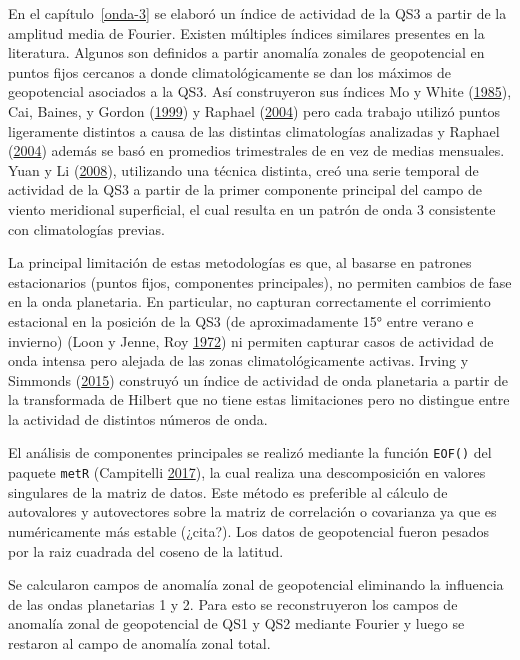 \documentclass[spanish,a4paper,12p]{book}
\begin{document}
En el capítulo~\ref{onda-3} se elaboró un índice de actividad de la QS3
a partir de la amplitud media de Fourier. Existen múltiples índices
similares presentes en la literatura. Algunos son definidos a partir
anomalía zonales de geopotencial en puntos fijos cercanos a donde
climatológicamente se dan los máximos de geopotencial asociados a la
QS3. Así construyeron sus índices Mo y White
(\protect\hyperlink{ref-Mo1985}{1985}), Cai, Baines, y Gordon
(\protect\hyperlink{ref-Cai1999}{1999}) y Raphael
(\protect\hyperlink{ref-Raphael2004a}{2004}) pero cada trabajo utilizó
puntos ligeramente distintos a causa de las distintas climatologías
analizadas y Raphael (\protect\hyperlink{ref-Raphael2004a}{2004}) además
se basó en promedios trimestrales de en vez de medias mensuales. Yuan y
Li (\protect\hyperlink{ref-Yuan2008}{2008}), utilizando una técnica
distinta, creó una serie temporal de actividad de la QS3 a partir de la
primer componente principal del campo de viento meridional superficial,
el cual resulta en un patrón de onda 3 consistente con climatologías
previas.

La principal limitación de estas metodologías es que, al basarse en
patrones estacionarios (puntos fijos, componentes principales), no
permiten cambios de fase en la onda planetaria. En particular, no
capturan correctamente el corrimiento estacional en la posición de la
QS3 (de aproximadamente 15° entre verano e invierno) (Loon y Jenne, Roy
\protect\hyperlink{ref-Loon1972}{1972}) ni permiten capturar casos de
actividad de onda intensa pero alejada de las zonas climatológicamente
activas. Irving y Simmonds (\protect\hyperlink{ref-Irving2015}{2015})
construyó un índice de actividad de onda planetaria a partir de la
transformada de Hilbert que no tiene estas limitaciones pero no
distingue entre la actividad de distintos números de onda.

El análisis de componentes principales se realizó mediante la función
\texttt{EOF()} del paquete \texttt{metR} (Campitelli
\protect\hyperlink{ref-R-metR}{2017}), la cual realiza una
descomposición en valores singulares de la matriz de datos. Este método
es preferible al cálculo de autovalores y autovectores sobre la matriz
de correlación o covarianza ya que es numéricamente más estable
(¿cita?). Los datos de geopotencial fueron pesados por la raiz cuadrada
del coseno de la latitud.

Se calcularon campos de anomalía zonal de geopotencial eliminando la
influencia de las ondas planetarias 1 y 2. Para esto se reconstruyeron
los campos de anomalía zonal de geopotencial de QS1 y QS2 mediante
Fourier y luego se restaron al campo de anomalía zonal total.
\end{document}
